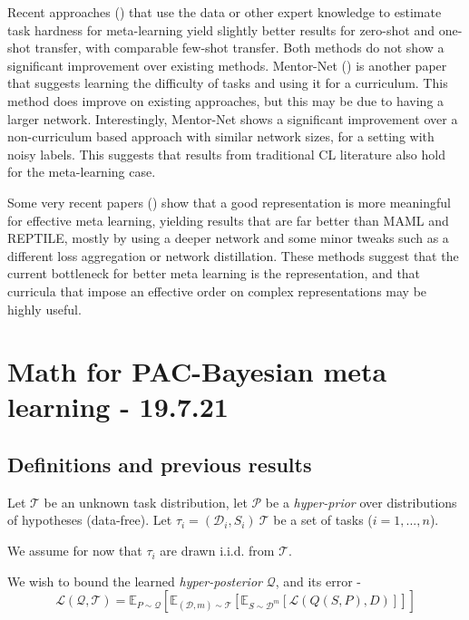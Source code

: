 \documentclass[letterpaper]{article}
\theoremstyle{definition}
\begin{document}
Recent approaches (\cite{Saglietti2021, Khodak2019}) that use the data or other expert knowledge to estimate task hardness for meta-learning yield slightly better results for zero-shot and one-shot transfer, with comparable few-shot transfer. 
Both methods do not show a significant improvement over existing methods.
Mentor-Net (\cite{Jiang2017}) is another paper that suggests learning the difficulty of tasks and using it for a curriculum. This method does improve on existing approaches, but this may be due to having a larger network.
Interestingly, Mentor-Net shows a significant improvement over a non-curriculum based approach with similar network sizes, for a setting with noisy labels. This suggests that results from traditional CL literature also hold for the meta-learning case.

Some very recent papers (\cite{Bateni2020, Tian2020}) show that a good representation is more meaningful for effective meta learning, yielding results that are far better than MAML and REPTILE, mostly by using a deeper network and some minor tweaks such as a different loss aggregation or network distillation. 
These methods suggest that the current bottleneck for better meta learning is the representation, and that curricula that impose an effective order on complex representations may be highly useful.

\section{Math for PAC-Bayesian meta learning - 19.7.21} \label{sec:bayes}

\subsection{Definitions and previous results}

Let $\mathcal{T}$ be an unknown task distribution, let $\mathcal{P}$ be a \emph{hyper-prior} over distributions of hypotheses (data-free). Let $\tau_i=(\mathcal{D}_i, S_i)~\mathcal{T}$ be a set of tasks ($i=1,...,n$).

We assume for now that $\tau_i$ are drawn i.i.d. from $\mathcal{T}$.

We wish to bound the learned \emph{hyper-posterior} $\mathcal{Q}$, and its error - 
$$\mathcal{L}(\mathcal{Q}, \mathcal{T})=\mathbb{E}_{P\sim \mathcal{Q}}[\mathbb{E}_{(\mathcal{D}, m)\sim \mathcal{T}}[\mathbb{E}_{S\sim \mathcal{D}^m}[\mathcal{L}(Q(S,P), D)]]]$$
\end{document}
